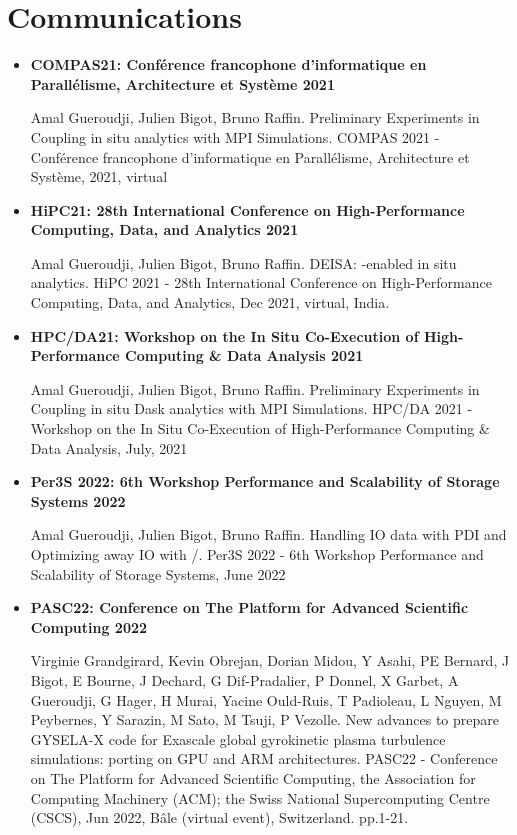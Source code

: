 
\section{Communications}
\begin{itemize}
  
  \item \textbf{COMPAS21: Conférence francophone d'informatique en Parallélisme, Architecture et Système 2021}

Amal Gueroudji, Julien Bigot, Bruno Raffin. Preliminary Experiments in Coupling in situ \dask analytics with MPI Simulations. COMPAS 2021 - Conférence francophone d'informatique en Parallélisme, Architecture et Système, 2021, virtual

  \item  \textbf{HiPC21:  28th International Conference on High-Performance Computing, Data, and Analytics 2021}

Amal Gueroudji, Julien Bigot, Bruno Raffin. DEISA: \dask-enabled in situ analytics. HiPC 2021 - 28th
International Conference on High-Performance Computing, Data, and Analytics, Dec 2021, virtual,
India. 

  \item \textbf{HPC/DA21:  Workshop on the In Situ Co-Execution of High-Performance Computing \& Data Analysis 2021}

Amal Gueroudji, Julien Bigot, Bruno Raffin. Preliminary Experiments in Coupling in situ Dask analytics with MPI Simulations. HPC/DA 2021 - Workshop on the In Situ Co-Execution of
High-Performance Computing \& Data Analysis, July, 2021

  \item  \textbf{Per3S 2022: 6th Workshop Performance and Scalability of Storage Systems 2022}

Amal Gueroudji, Julien Bigot, Bruno Raffin. Handling IO data with PDI and Optimizing away IO with \pdi/\deisa. Per3S 2022 - 6th Workshop Performance and Scalability of Storage Systems, June 2022


  \item \textbf{PASC22: Conference on The Platform for Advanced Scientific Computing 2022}

Virginie Grandgirard, Kevin Obrejan, Dorian Midou, Y Asahi, PE Bernard, J Bigot, E Bourne, J Dechard, G Dif-Pradalier, P Donnel, X Garbet, A Gueroudji, G Hager, H Murai, Yacine Ould-Ruis, T Padioleau, L Nguyen, M Peybernes, Y Sarazin, M Sato, M Tsuji, P Vezolle. New advances to prepare GYSELA-X code for Exascale global gyrokinetic plasma turbulence simulations: porting on GPU and ARM architectures. PASC22 - Conference on The Platform for Advanced Scientific Computing, the Association for Computing Machinery (ACM); the Swiss National Supercomputing Centre (CSCS), Jun 2022, Bâle (virtual event), Switzerland. pp.1-21. 


\end{itemize}
